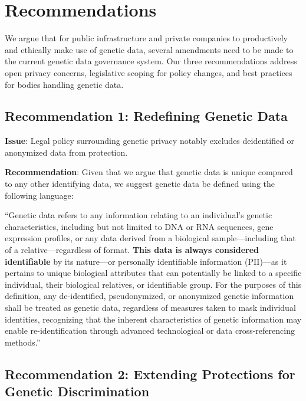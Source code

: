 \section{Recommendations}
\label{section:recommendations}

We argue that for public infrastructure and private companies to productively and ethically make use of genetic data, several amendments need to be made to the current genetic data governance system. 
Our three recommendations address open privacy concerns, legislative scoping for policy changes, and best practices for bodies handling genetic data.

\subsection{Recommendation 1: Redefining Genetic Data}

\textbf{Issue}: Legal policy surrounding genetic privacy notably excludes deidentified or anonymized data from protection.

\textbf{Recommendation}: Given that we argue that genetic data is unique compared to any other identifying data, we suggest genetic data be defined using the following language: 

``Genetic data refers to any information relating to an individual’s genetic characteristics, including but not limited to DNA or RNA sequences, gene expression profiles, or any data derived from a biological sample—including that of a relative—regardless of format. \textbf{This data is always considered identifiable} by its nature—or personally identifiable information (PII)—as it pertains to unique biological attributes that can potentially be linked to a specific individual, their biological relatives, or identifiable group. For the purposes of this definition, any de-identified, pseudonymized, or anonymized genetic information shall be treated as genetic data, regardless of measures taken to mask individual identities, recognizing that the inherent characteristics of genetic information may enable re-identification through advanced technological or data cross-referencing methods.''

\subsection{Recommendation 2: Extending Protections for Genetic Discrimination}

